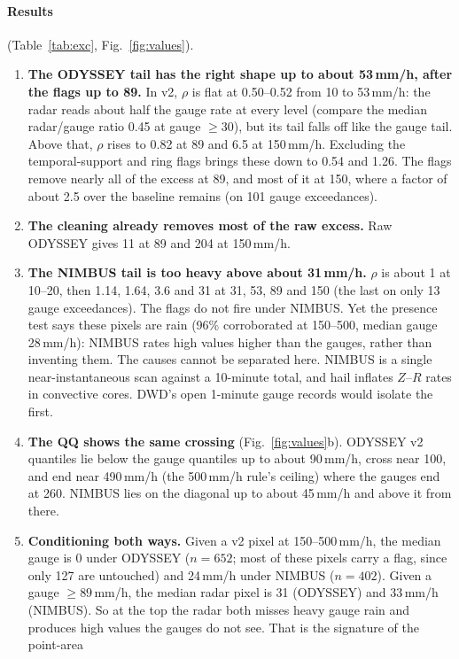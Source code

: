 \documentclass[11pt,a4paper]{article}
\theoremstyle{definition}
\theoremstyle{remark}
\newcommand{\1}{\mathbf{1}}
\begin{document}
\paragraph{Results} (Table~\ref{tab:exc}, Fig.~\ref{fig:values}).
\begin{enumerate}
\item \textbf{The ODYSSEY tail has the right shape up to about 53\,mm/h, after the flags up to
  89.} In v2, $\rho$ is flat at 0.50--0.52 from 10 to 53\,mm/h: the radar reads about half
  the gauge rate at every level (compare the median radar/gauge ratio 0.45 at gauge
  $\ge30$), but its tail falls off like the gauge tail. Above that, $\rho$ rises to 0.82 at 89
  and 6.5 at 150\,mm/h. Excluding the temporal-support and ring flags brings these down to
  0.54 and 1.26. The flags remove nearly all of the excess at 89, and most of it at 150,
  where a factor of about 2.5 over the baseline remains (on 101 gauge exceedances).
\item \textbf{The cleaning already removes most of the raw excess.} Raw ODYSSEY gives 11 at 89
  and 204 at 150\,mm/h.
\item \textbf{The NIMBUS tail is too heavy above about 31\,mm/h.} $\rho$ is about 1 at 10--20,
  then 1.14, 1.64, 3.6 and 31 at 31, 53, 89 and 150 (the last on only 13 gauge
  exceedances). The flags do not fire under NIMBUS. Yet the presence test says these pixels
  are rain (96\% corroborated at 150--500, median gauge 28\,mm/h): NIMBUS rates high values
  higher than the gauges, rather than inventing them. The causes cannot be separated here.
  NIMBUS is a single near-instantaneous scan against a 10-minute total, and hail inflates
  $Z$--$R$ rates in convective cores. DWD's open 1-minute gauge records would isolate the
  first.
\item \textbf{The QQ shows the same crossing} (Fig.~\ref{fig:values}b). ODYSSEY v2 quantiles lie
  below the gauge quantiles up to about 90\,mm/h, cross near 100, and end near 490\,mm/h
  (the 500\,mm/h rule's ceiling) where the gauges end at 260. NIMBUS lies on the diagonal up
  to about 45\,mm/h and above it from there.
\item \textbf{Conditioning both ways.} Given a v2 pixel at 150--500\,mm/h, the median gauge is
  0 under ODYSSEY ($n=652$; most of these pixels carry a flag, since only 127 are untouched)
  and 24\,mm/h under NIMBUS ($n=402$). Given a gauge $\ge89$\,mm/h, the median radar pixel
  is 31 (ODYSSEY) and 33\,mm/h (NIMBUS). So at the top the radar both misses heavy gauge rain
  and produces high values the gauges do not see. That is the signature of the point-area

\end{enumerate}
\end{document}
